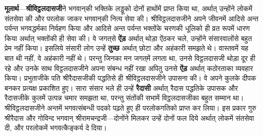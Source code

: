 \begin{sloppypar}\justifying{}
\textbf{मूलार्थ}—\textbf{श्रीविट्ठल\-दासजी}ने भगवान्‌की भक्तिके लड्डूको दोनों हाथोंमें प्राप्त किया था, अर्थात् उन्होंने लोकमें संत\-सेवा की और परलोक जाकर भगवान्‌की नित्य सेवा की। श्रीविट्ठल\-दासजीने अपने जीवनमें आदिसे अन्त पर्यन्त भगवद्धर्मका निर्वहण किया और आदिसे अन्त पर्यन्त भक्तोंके चरणकी धूलिको ही व्रत रूपमें धारण किया अर्थात् भक्तोंकी ही सेवा की। वे जगत्‌से \textbf{ऐंड़} अर्थात् थोड़ा ऐंठकर चले, उन्होंने संसारवालोंसे बहुत प्रेम नहीं किया। इसलिये संसारी लोग उन्हें \textbf{तुच्छ} अर्थात् छोटा और अहंकारी समझते थे। वास्तवमें यह बात थी नहीं, वे अहंकारी नहीं थे। परन्तु जिनका मन जगत्‌में लगता था, उनसे विट्ठल\-दासजी थोड़ा दूर ही रहे और उनके साथ विट्ठल\-दासजीने अपना संबन्ध नहीं रखा अपितु उनसे \textbf{ऐंड़} अर्थात् कठोरताका व्यवहार किया। प्रभुताजीके पति श्रीरैदासजीकी पद्धतिसे ही श्रीविट्ठल\-दासजीने उपासना की। वे अपने कुलके दीपक बनकर प्रत्यक्ष प्रकाशित हुए। सारा संसार भले ही उन्हें \textbf{रैदासी} अर्थात् रैदास पद्धतिके उपासक और रैदासजीके कुलमें उत्पन्न चमार समझता था, परन्तु संतोंकी सभामें विट्ठल\-दासजीका बहुत सम्मान था। श्रीविट्ठल\-दासजीने अन्तमें भगवत्संबन्धी पदको पढ़ते हुए ही परलोक\-गतिको प्राप्त कर लिया। इस प्रकार गुरु श्रीरैदास और गोविन्द भगवान् श्रीरामचन्द्रजी—दोनोंने मिलकर उन्हें दोनों फल दिये अर्थात् लोकमें संतसेवा दी, और परलोकमें भगवत्कैङ्कर्य दे दिया।
\end{sloppypar}



